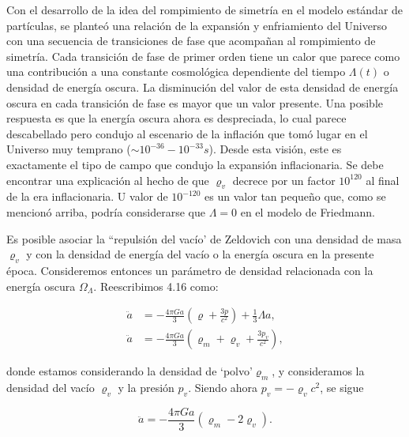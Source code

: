 \documentclass[11pt]{article}
\begin{document}
    Con el desarrollo de la idea del rompimiento de simetría en el modelo estándar de partículas, se planteó una relación de la expansión y enfriamiento del Universo con una secuencia de transiciones de fase que acompañan al rompimiento de simetría. Cada transición de fase de primer orden tiene un calor que parece como una contribución a una constante cosmológica dependiente del tiempo $\Lambda(t)$ o densidad de energía oscura. La disminución del valor de esta densidad de energía oscura en cada transición de fase es mayor que un valor presente. Una posible respuesta es que la energía oscura ahora es despreciada, lo cual parece descabellado pero condujo al escenario de la inflación que tomó lugar en el Universo muy temprano ($\sim 10^{-36} - 10^{-33} s$). Desde esta visión, este es exactamente el tipo de campo que condujo la expansión inflacionaria. Se debe encontrar una explicación al hecho de que $\varrho_v$ decrece por un factor $10^{120}$ al final de la era inflacionaria. U valor de $10^{-120}$ es un valor tan pequeño que, como se mencionó arriba, podría considerarse que $\Lambda=0$ en el modelo de Friedmann. 

   Es posible asociar la ``repulsión del vacío' de Zeldovich con una densidad de masa $\varrho_v$ y con la densidad de energía del vacío o la energía oscura en la presente época. Consideremos entonces un parámetro de densidad relacionada con la energía oscura $\Omega_{\Lambda}$. Reescribimos 4.16 como:
   
   \begin{align}
         \ddot{a} & = - \frac{4 \pi Ga}{3}  \left( \varrho + \frac{3p}{c^2} \right) + \frac{1}{3} \Lambda a, \\
          \ddot{a} & = - \frac{4 \pi Ga}{3}  \left( \varrho_m + \varrho_v + \frac{3p_v}{c^2} \right),
   \end{align}
       
    donde estamos considerando la densidad de `polvo'$\varrho_{m}$, y consideramos la densidad del vacío $\varrho_v$ y la presión $p_v$. Siendo ahora $p_v = - \varrho_vc^2$, se sigue
    
    \begin{equation}
        \ddot{a} = - \frac{4 \pi G a}{3}  \left( \varrho_m -2\varrho_v \right).
    \end{equation}
    
    
    
    
    
    
    
    
    
\end{document}
